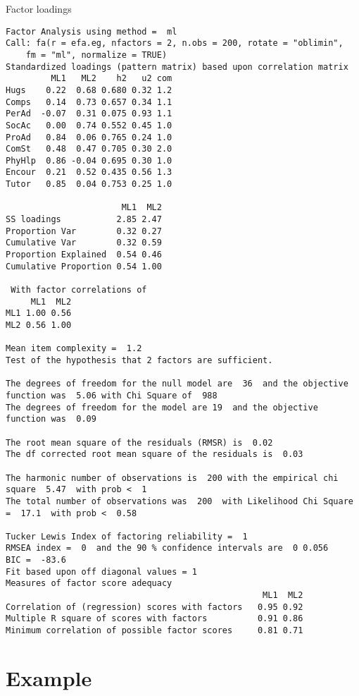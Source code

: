 \documentclass[10pt,ignorenonframetext,]{beamer}
\begin{document}
\begin{frame}[fragile]{Factor loadings}

\tiny

\begin{verbatim}
Factor Analysis using method =  ml
Call: fa(r = efa.eg, nfactors = 2, n.obs = 200, rotate = "oblimin", 
    fm = "ml", normalize = TRUE)
Standardized loadings (pattern matrix) based upon correlation matrix
         ML1   ML2    h2   u2 com
Hugs    0.22  0.68 0.680 0.32 1.2
Comps   0.14  0.73 0.657 0.34 1.1
PerAd  -0.07  0.31 0.075 0.93 1.1
SocAc   0.00  0.74 0.552 0.45 1.0
ProAd   0.84  0.06 0.765 0.24 1.0
ComSt   0.48  0.47 0.705 0.30 2.0
PhyHlp  0.86 -0.04 0.695 0.30 1.0
Encour  0.21  0.52 0.435 0.56 1.3
Tutor   0.85  0.04 0.753 0.25 1.0

                       ML1  ML2
SS loadings           2.85 2.47
Proportion Var        0.32 0.27
Cumulative Var        0.32 0.59
Proportion Explained  0.54 0.46
Cumulative Proportion 0.54 1.00

 With factor correlations of 
     ML1  ML2
ML1 1.00 0.56
ML2 0.56 1.00

Mean item complexity =  1.2
Test of the hypothesis that 2 factors are sufficient.

The degrees of freedom for the null model are  36  and the objective function was  5.06 with Chi Square of  988
The degrees of freedom for the model are 19  and the objective function was  0.09 

The root mean square of the residuals (RMSR) is  0.02 
The df corrected root mean square of the residuals is  0.03 

The harmonic number of observations is  200 with the empirical chi square  5.47  with prob <  1 
The total number of observations was  200  with Likelihood Chi Square =  17.1  with prob <  0.58 

Tucker Lewis Index of factoring reliability =  1
RMSEA index =  0  and the 90 % confidence intervals are  0 0.056
BIC =  -83.6
Fit based upon off diagonal values = 1
Measures of factor score adequacy             
                                                   ML1  ML2
Correlation of (regression) scores with factors   0.95 0.92
Multiple R square of scores with factors          0.91 0.86
Minimum correlation of possible factor scores     0.81 0.71
\end{verbatim}

\end{frame}

\section{Example}\label{example}
\end{document}
